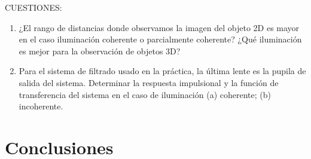 \documentclass{./packages/optica-article}
\begin{document}
CUESTIONES:
\begin{enumerate}
\item ¿El rango de distancias donde observamos la imagen del objeto 2D es mayor en el caso iluminación coherente o parcialmente coherente? ¿Qué iluminación es mejor para la observación de objetos 3D?
\item Para el sistema de filtrado usado en la práctica, la última lente es la pupila de salida del sistema. Determinar la respuesta impulsional y la función de transferencia del sistema en el caso de iluminación (a) coherente; (b) incoherente.

\end{enumerate}

\section{Conclusiones}


\end{document}
